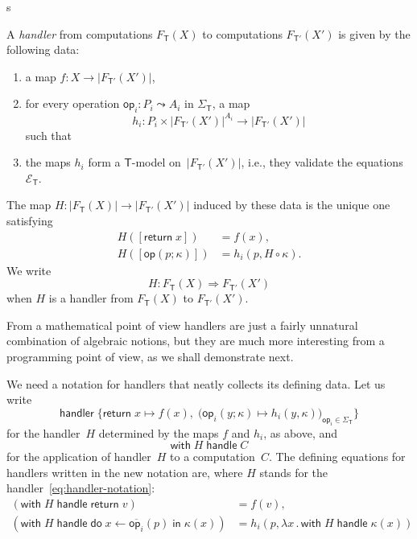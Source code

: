 s\documentclass{amsart}
\newcommand{\theory}[1]{\mathsf{#1}} %
\newcommand{\signature}[1]{\Sigma_{\theory{#1}}} %
\newcommand{\equations}[1]{\mathcal{E}_{\theory{#1}}} %
\newcommand{\carrier}[1]{|#1|} %
\newcommand{\Free}[2]{F_{\theory{#1}}(#2)} %
\newcommand{\lam}[1]{\lambda #1 \,.\,}
\newcommand{\op}[1]{\mathsf{op}_{#1}} %
\newcommand{\opdecl}[3]{#1 : #2 \leadsto #3} %
\newcommand{\hto}{\Rightarrow} %
\newcommand{\kode}[1]{\mathsf{#1}}
\newcommand{\seq}[2]{\kode{do}\; #1 \leftarrow #2 \;\kode{in}\;}
\newcommand{\handler}{\kode{handler}\;}
\newcommand{\xopgen}[2]{\overline{#1}(#2)}
\newcommand{\opcall}[3]{\kode{#1}(#2; #3)}
\newcommand{\opclause}[3]{#1(#2; #3) \mapsto}
\newcommand{\return}[1]{\kode{return}\;#1}
\newcommand{\retclause}[1]{\return{#1} \mapsto}
\newcommand{\withhandle}[2]{\kode{with}\; #1\; \kode{handle}\; #2}
\begin{document}
A \emph{handler} from computations $\Free{T}{X}$ to computations $\Free{T'}{X'}$
is given by the following data:
%
\begin{enumerate}
\item a map $f : X \to \carrier{\Free{T'}{X'}}$,
\item for every operation $\opdecl{\op{i}}{P_i}{A_i}$ in $\signature{T}$, a map
  \begin{equation*}
    h_i : P_i \times \carrier{\Free{T'}{X'}}^{A_i} \to \carrier{\Free{T'}{X'}}
  \end{equation*}
  such that
\item the maps $h_i$ form a $\theory{T}$-model on~$\carrier{\Free{T'}{X'}}$, i.e., they
 validate the equations~$\equations{T}$.
\end{enumerate}
%
The map $H : \carrier{\Free{T}{X}} \longrightarrow \carrier{\Free{T'}{X'}}$ induced by these
data is the unique one satisfying
%
\begin{align*}
  H([\return{x}]) &= f(x), \\
  H([\opcall{op}{p}{\kappa}]) &= h_i(p, H \circ \kappa).
\end{align*}
%
We write
%
\begin{equation*}
  H : \Free{T}{X} \hto \Free{T'}{X'}
\end{equation*}
%
when $H$ is a handler from $\Free{T}{X}$ to $\Free{T'}{X'}$.

From a mathematical point of view handlers are just a fairly unnatural
combination of algebraic notions, but they are much more interesting from a
programming point of view, as we shall demonstrate next.

We need a notation for handlers that neatly collects its defining data. Let us write
%
\begin{equation}
  \label{eq:handler-notation}
  \handler \{
    \retclause{x} f(x), \;
    \big( \opclause{\op{i}}{y}{\kappa} h_i(y, \kappa) \big)_{\op{i} \in \signature{T}}
  \}
\end{equation}
%
for the handler~$H$ determined by the maps $f$ and $h_i$, as above, and
%
\begin{equation*}
  \withhandle{H}{C}
\end{equation*}
%
for the application of handler~$H$ to a computation~$C$. The defining
equations for handlers written in the new notation are, where $H$ stands for the
handler~\eqref{eq:handler-notation}:
%
\begin{align*}
  (\withhandle{H}{\return v}) &= f(v), \\
  (\withhandle{H}{\seq{x}{\xopgen{\op{i}}{p}} \kappa(x)}) &=
  h_i (p, \lam{x} \withhandle{H}{\kappa(x)})
\end{align*}
\end{document}
